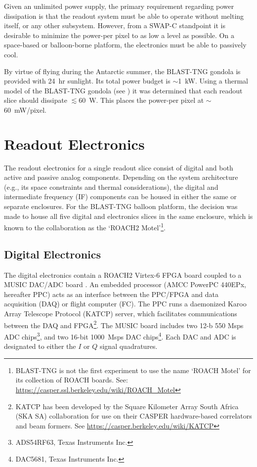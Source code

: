 Given an unlimited power supply, the primary requirement regarding power dissipation is that the readout system must be able to operate without melting itself, or any other subsystem. However, from a SWAP-C standpoint it is desirable to minimize the power-per pixel to as low a level as possible. On a space-based or balloon-borne platform, the electronics must be able to passively cool.

By virtue of flying during the Antarctic summer, the BLAST-TNG gondola is provided with 24~hr sunlight. Its total power budget is $\sim$1~kW. Using a thermal model of the BLAST-TNG gondola (see \citet{gordon2016}) it was determined that each readout slice should dissipate $\lesssim{60}$~W. This places the power-per pixel at $\sim$60~mW/pixel.

\section{Readout Electronics}\label{hardware and elec}

The readout electronics for a single readout slice consist of digital and both active and passive analog components. Depending on the system architecture (e.g., its space constraints and thermal considerations), the digital and intermediate frequency (IF) components can be housed in either the same or separate enclosures. For the BLAST-TNG balloon platform, the decision was made to house all five digital and electronics slices in the same enclosure, which is known to the collaboration as the `ROACH2 Motel'\footnote{BLAST-TNG is not the first experiment to use the name `ROACH Motel' for its collection of ROACH boards. See: \url{https://casper.ssl.berkeley.edu/wiki/ROACH_Motel}}.

\subsection{Digital Electronics}\label{digital electronics}

The digital electronics contain a ROACH2 Virtex-6 FPGA board coupled to a MUSIC DAC/ADC board \citep{duan2010open}. An embedded processor (AMCC PowerPC 440EPx, hereafter PPC) acts as an interface between the PPC/FPGA and data acquisition (DAQ) or flight computer (FC). The PPC runs a daemonized Karoo Array Telescope Protocol (KATCP) server, which facilitates communications between the DAQ and FPGA\footnote{KATCP has been developed by the Square Kilometer Array South Africa (SKA SA) collaboration for use on their CASPER hardware-based correlators and beam formers. See
\url{https://casper.berkeley.edu/wiki/KATCP}}. The MUSIC board includes two 12-b 550 Msps ADC chips\footnote{ADS54RF63, Texas Instruments Inc.}, and two 16-bit 1000~Msps DAC chips\footnote{DAC5681, Texas Instruments Inc.}. Each DAC and ADC is designated to either the $I$ or $Q$ signal quadratures.

